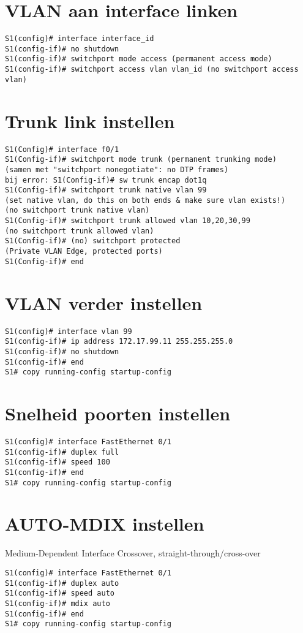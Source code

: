 \documentclass[10pt, a4paper]{article}
\begin{document}
\section{VLAN aan interface linken}
\begin{lstlisting}
S1(config)# interface interface_id
S1(config-if)# no shutdown
S1(config-if)# switchport mode access (permanent access mode)
S1(config-if)# switchport access vlan vlan_id (no switchport access vlan)
\end{lstlisting}

\section{Trunk link instellen}
\begin{lstlisting}
S1(Config)# interface f0/1
S1(Config-if)# switchport mode trunk (permanent trunking mode)
(samen met "switchport nonegotiate": no DTP frames)
bij error: S1(Config-if)# sw trunk encap dot1q
S1(Config-if)# switchport trunk native vlan 99
(set native vlan, do this on both ends & make sure vlan exists!)
(no switchport trunk native vlan)
S1(Config-if)# switchport trunk allowed vlan 10,20,30,99
(no switchport trunk allowed vlan)
S1(Config-if)# (no) switchport protected
(Private VLAN Edge, protected ports)
S1(Config-if)# end
\end{lstlisting}

\section{VLAN verder instellen}
\begin{lstlisting}
S1(config)# interface vlan 99
S1(config-if)# ip address 172.17.99.11 255.255.255.0
S1(config-if)# no shutdown
S1(config-if)# end
S1# copy running-config startup-config
\end{lstlisting}

\section{Snelheid poorten instellen}
\begin{lstlisting}
S1(config)# interface FastEthernet 0/1
S1(config-if)# duplex full
S1(config-if)# speed 100
S1(config-if)# end
S1# copy running-config startup-config
\end{lstlisting}

\section{AUTO-MDIX instellen}
Medium-Dependent Interface Crossover, straight-through/cross-over\\
\begin{lstlisting}
S1(config)# interface FastEthernet 0/1
S1(config-if)# duplex auto
S1(config-if)# speed auto
S1(config-if)# mdix auto
S1(config-if)# end
S1# copy running-config startup-config
\end{lstlisting}
\end{document}
